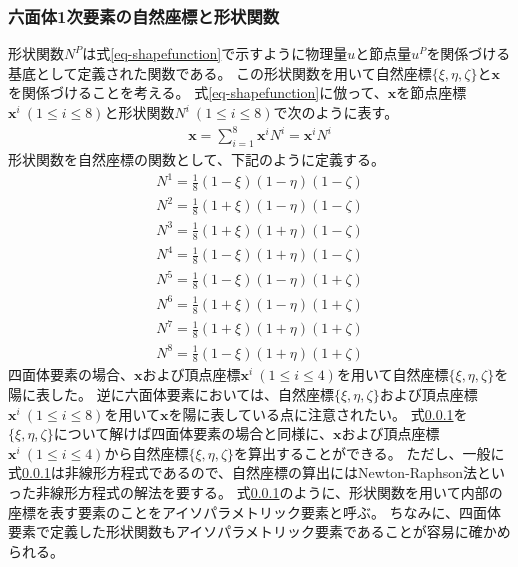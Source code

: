 \documentclass{jarticle}
\begin{document}
\subsubsection{六面体1次要素の自然座標と形状関数}
形状関数$N^P$は式\ref{eq-shapefunction}で示すように物理量$u$と節点量$u^P$を関係づける基底として定義された関数である。
この形状関数を用いて自然座標$\{\xi, \eta, \zeta\}$と$\bm{x}$を関係づけることを考える。
式\ref{eq-shapefunction}に倣って、$\bm{x}$を節点座標$\bm{x}^i~(1\leq i\leq 8)$と形状関数$N^i~(1\leq i\leq 8)$で次のように表す。
\begin{align}
  \bm{x} = \sum_{i=1}^8\bm{x}^iN^i = \bm{x}^iN^i
\end{align}
形状関数を自然座標の関数として、下記のように定義する。
\begin{align}
  N^1 = \frac{1}{8}(1-\xi)(1-\eta)(1-\zeta)\\
  N^2 = \frac{1}{8}(1+\xi)(1-\eta)(1-\zeta)\\
  N^3 = \frac{1}{8}(1+\xi)(1+\eta)(1-\zeta)\\
  N^4 = \frac{1}{8}(1-\xi)(1+\eta)(1-\zeta)\\
  N^5 = \frac{1}{8}(1-\xi)(1-\eta)(1+\zeta)\\
  N^6 = \frac{1}{8}(1+\xi)(1-\eta)(1+\zeta)\\
  N^7 = \frac{1}{8}(1+\xi)(1+\eta)(1+\zeta)\\
  N^8 = \frac{1}{8}(1-\xi)(1+\eta)(1+\zeta)
\end{align}
四面体要素の場合、$\bm{x}$および頂点座標$\bm{x}^i~(1\leq i\leq 4)$を用いて自然座標$\{\xi, \eta, \zeta\}$を陽に表した。
逆に六面体要素においては、自然座標$\{\xi, \eta, \zeta\}$および頂点座標$\bm{x}^i~(1\leq i\leq 8)$を用いて$\bm{x}$を陽に表している点に注意されたい。
式\ref{}を$\{\xi, \eta, \zeta\}$について解けば四面体要素の場合と同様に、$\bm{x}$および頂点座標$\bm{x}^i~(1\leq i\leq 4)$から自然座標$\{\xi, \eta, \zeta\}$を算出することができる。
ただし、一般に式\ref{}は非線形方程式であるので、自然座標の算出にはNewton-Raphson法といった非線形方程式の解法を要する。
式\ref{}のように、形状関数を用いて内部の座標を表す要素のことをアイソパラメトリック要素と呼ぶ。
ちなみに、四面体要素で定義した形状関数もアイソパラメトリック要素であることが容易に確かめられる。
\end{document}
